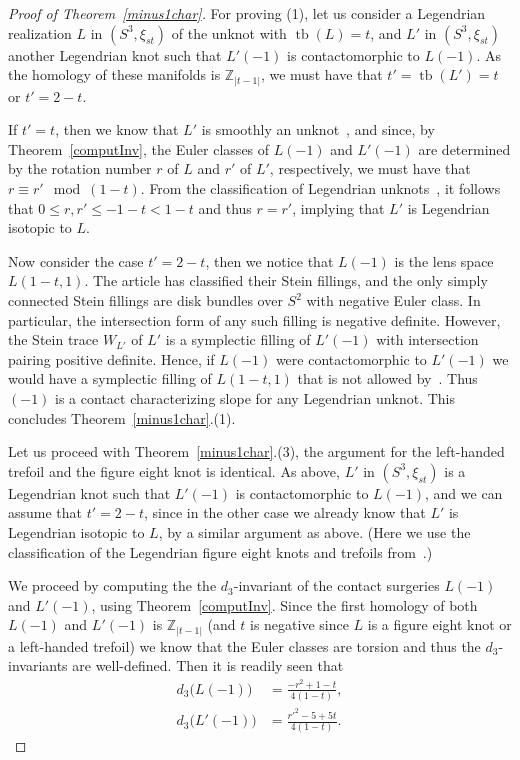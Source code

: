 \documentclass[11pt]{amsart} %
\DeclareMathOperator{\tb}{tb}
\newcommand{\Z}{\mathbb{Z}}
\theoremstyle{plain}
\theoremstyle{definition}
\begin{document}
\begin{proof}[Proof of Theorem~\ref{minus1char}] For proving (1), let us consider a Legendrian realization $L$ in $(S^3,\xi_{st})$ of the unknot with $\tb(L)=t$, and $L'$ in $(S^3,\xi_{st})$ another Legendrian knot such that $L'(-1)$ is contactomorphic to $L(-1)$. As the homology of these manifolds is $\Z_{|t-1|}$, we must have that $t'=\tb(L')=t$ or $t'=2-t$.
	
	If $t'=t$, then we know that $L'$ is smoothly an unknot~\cite{KronheimerMrowkaOzsvathSzabo07}, and since, by Theorem~\ref{computInv}, the Euler classes of $L(-1)$ and $L'(-1)$ are determined by the rotation number $r$ of $L$ and $r'$ of $L'$, respectively, we must have that $r\equiv r'  \mod (1-t)$. From the classification of Legendrian unknots~\cite{EliashbergFraser98}, it follows that $0\leq r,r'\leq-1-t < 1-t$ and thus $r=r'$, implying that $L'$ is Legendrian isotopic to $L$. 
	
	Now consider the case $t'=2-t$, then we notice that $L(-1)$ is the lens space $L(1-t,1)$. The article \cite{McDuff90} has classified their Stein fillings, and the only simply connected Stein fillings are disk bundles over $S^2$ with negative Euler class. In particular, the intersection form of any such filling is negative definite. However, the Stein trace $W_{L'}$ of $L'$ is a symplectic filling of $L'(-1)$ with intersection pairing positive definite. Hence, if $L(-1)$ were contactomorphic to $L'(-1)$ we would have a symplectic filling of $L(1-t,1)$ that is not allowed by~\cite{McDuff90}. Thus $(-1)$ is a contact characterizing slope for any Legendrian unknot. This concludes Theorem~\ref{minus1char}.(1). 
	
	Let us proceed with Theorem~\ref{minus1char}.(3),
	the argument for the left-handed trefoil and the figure eight knot is identical. As above, $L'$ in $(S^3,\xi_{st})$ is a Legendrian knot such that $L'(-1)$ is contactomorphic to $L(-1)$, and we can assume that $t'=2-t$, since in the other case we already know that $L'$ is Legendrian isotopic to $L$, by a similar argument as above. (Here we use the classification of the Legendrian figure eight knots and trefoils from~\cite{EtnyreHonda01b}.)
	
	We proceed by computing the the $d_3$-invariant of the contact surgeries $L(-1)$ and $L'(-1)$, using Theorem~\ref{computInv}. Since the first homology of both $L(-1)$ and $L'(-1)$ is $\Z_{|t-1|}$ (and $t$ is negative since $L$ is a figure eight knot or a left-handed trefoil) we know that the Euler classes are torsion and thus the $d_3$-invariants are well-defined. Then it is readily seen that
	\begin{align*}
	d_3\big(L(-1)\big)&= \frac{-r^2+1-t}{4(1-t)},\\
	d_3\big(L'(-1)\big)&= \frac{{r'}^2-5+5t}{4(1-t)}.
	\end{align*}


\end{proof}
\end{document}
